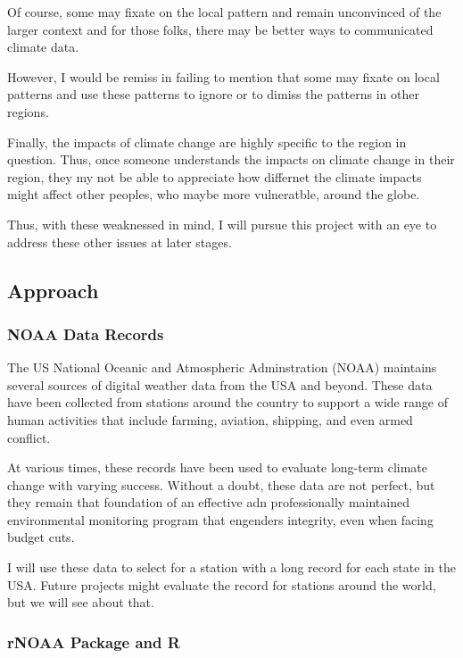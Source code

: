 \documentclass{article}
\begin{document}
Of course, some may fixate on the local pattern and remain unconvinced of the larger context and for those folks, there may be better ways to communicated climate data. 

However, I would be remiss in failing to mention that some may fixate on local patterns and use these patterns to ignore or to dimiss the patterns in other regions. 

Finally, the impacts of climate change are highly specific to the region in question. Thus, once someone understands the impacts on climate change in their region, they my not be able to appreciate how differnet the climate impacts might affect other peoples, who maybe more vulneratble, around the globe. 

Thus, with these weaknessed in mind, I will pursue this project with an eye to address these other issues at later stages.

\subsection{Approach}

\subsubsection{NOAA Data Records}

The US National Oceanic and Atmospheric Adminstration (NOAA) maintains several sources of digital weather data from the USA and beyond. These data have been collected from stations around the country to support a wide range of human activities that include farming, aviation, shipping, and even armed conflict. 

At various times, these records have been used to evaluate long-term climate change with varying success. Without a doubt, these data are not perfect, but they remain that foundation of an effective adn professionally maintained environmental monitoring program that engenders integrity, even when facing budget cuts. 

I will use these data to select for a station with a long record for each state in the USA. Future projects might evaluate the record for stations around the world, but we will see about that. 


\subsubsection{rNOAA Package and R}
\end{document}
